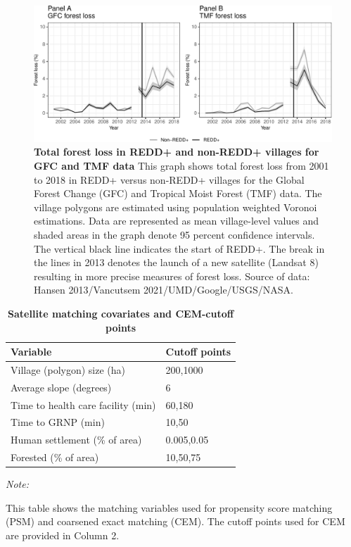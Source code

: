 \documentclass[
]{article}
\begin{document}
\begin{figure}[H]

{\centering \includegraphics[width=6in]{paper_REDD_replication_files/figure-latex/figForestlossGFC_TMF-1} 

}

\caption{\textbf{Total forest loss in REDD+ and non-REDD+ villages for GFC and TMF data} This graph shows total forest loss from 2001 to 2018 in REDD+ versus non-REDD+ villages for the Global Forest Change (GFC) and Tropical Moist Forest (TMF) data. The village polygons are estimated using population weighted Voronoi estimations. Data are represented as mean village-level values and shaded areas in the graph denote 95 percent confidence intervals. The vertical black line indicates the start of REDD+. The break in the lines in 2013 denotes the launch of a new satellite (Landsat 8) resulting in more precise measures of forest loss. Source of data: Hansen 2013/Vancutsem 2021/UMD/Google/USGS/NASA.}\label{fig:figForestlossGFC_TMF}
\end{figure}

\begin{table}[!h]

\caption{\label{tab:tabBins}\textbf{Satellite matching covariates and CEM-cutoff points}}
\centering
\begin{threeparttable}
\begin{tabular}[t]{>{\raggedright\arraybackslash}p{20em}l}
\toprule
\textbf{Variable} & \textbf{Cutoff points}\\
\midrule
Village (polygon) size (ha) & 200,1000\\
Average slope (degrees) & 6\\
Time to health care facility (min) & 60,180\\
Time to GRNP (min) & 10,50\\
Human settlement (\% of area) & 0.005,0.05\\
Forested (\% of area) & 10,50,75\\
\bottomrule
\end{tabular}
\begin{tablenotes}
\item \textit{Note: } 
\item This table shows the matching variables used for propensity score matching (PSM) and coarsened exact matching (CEM). The cutoff points used for CEM are provided in Column 2. 
\end{tablenotes}
\end{threeparttable}
\end{table}
\end{document}
